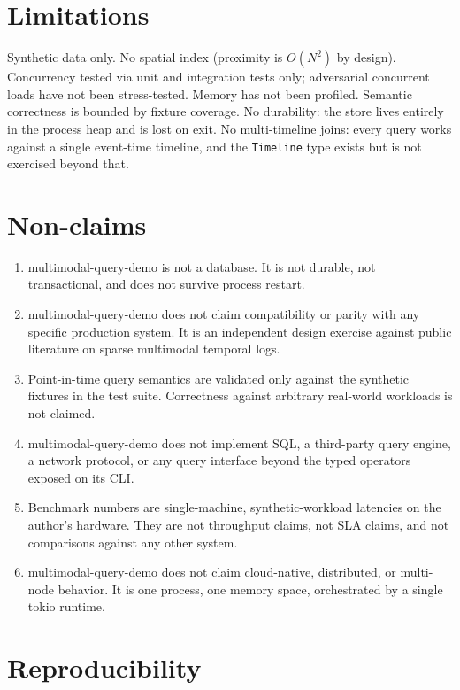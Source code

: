 \documentclass[11pt]{article}
\begin{document}
\section{Limitations}

Synthetic data only. No spatial index (proximity is $O(N^2)$ by design). Concurrency
tested via unit and integration tests only; adversarial concurrent loads have not been
stress-tested. Memory has not been profiled. Semantic correctness is bounded by fixture
coverage. No durability: the store lives entirely in the process heap and is lost on
exit. No multi-timeline joins: every query works against a single event-time timeline,
and the \texttt{Timeline} type exists but is not exercised beyond that.

\section{Non-claims}
\label{sec:nonclaims}

\begin{enumerate}[label=\arabic*.]
  \item multimodal-query-demo is not a database. It is not durable, not transactional, and does not survive process restart.
  \item multimodal-query-demo does not claim compatibility or parity with any specific production system. It is an independent design exercise against public literature on sparse multimodal temporal logs.
  \item Point-in-time query semantics are validated only against the synthetic fixtures in the test suite. Correctness against arbitrary real-world workloads is not claimed.
  \item multimodal-query-demo does not implement SQL, a third-party query engine, a network protocol, or any query interface beyond the typed operators exposed on its CLI.
  \item Benchmark numbers are single-machine, synthetic-workload latencies on the author's hardware. They are not throughput claims, not SLA claims, and not comparisons against any other system.
  \item multimodal-query-demo does not claim cloud-native, distributed, or multi-node behavior. It is one process, one memory space, orchestrated by a single tokio runtime.
\end{enumerate}

\section{Reproducibility}
\end{document}
